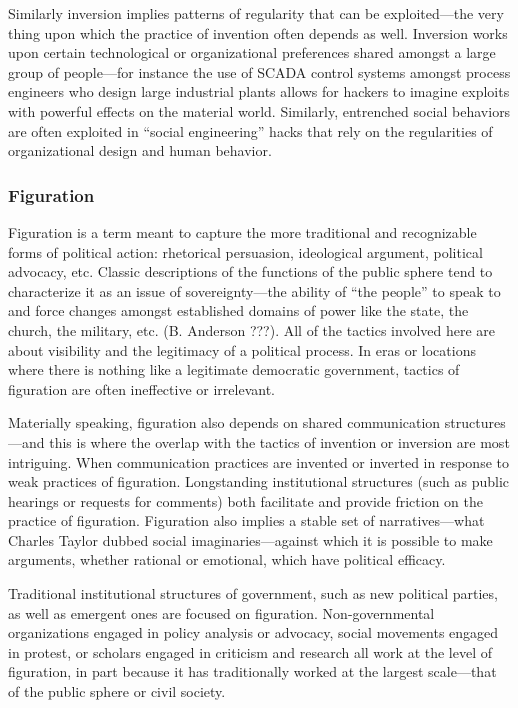 \documentclass[10pt,letter,oneside]{scrartcl}
\begin{document}
Similarly inversion implies patterns of regularity that can be exploited---the
very thing upon which the practice of invention often depends as well.
Inversion works upon certain technological or organizational preferences shared
amongst a large group of people---for instance the use of SCADA control systems
amongst process engineers who design large industrial plants allows for hackers
to imagine exploits with powerful effects on the material world.  Similarly,
entrenched social behaviors are often exploited in ``social engineering'' hacks
that rely on the regularities of organizational design and human behavior.

\subsubsection{Figuration}

Figuration is a term meant to capture the more traditional and recognizable
forms of political action: rhetorical persuasion, ideological argument,
political advocacy, etc.  Classic descriptions of the functions of the public
sphere tend to characterize it as an issue of sovereignty---the ability of
``the people'' to speak to and force changes amongst established domains of
power like the state, the church, the military, etc. (B. Anderson ???).  All of
the tactics involved here are about visibility and the legitimacy of a
political process.  In eras or locations where there is nothing like a
legitimate democratic government, tactics of figuration are often ineffective
or irrelevant.

Materially speaking, figuration also depends on shared communication
structures---and this is where the overlap with the tactics of invention or
inversion are most intriguing.  When communication practices are invented or
inverted in response to weak practices of figuration.  Longstanding
institutional structures (such as public hearings or requests for comments)
both facilitate and provide friction on the practice of figuration.  Figuration
also implies a stable set of narratives---what Charles Taylor dubbed social
imaginaries---against which it is possible to make arguments, whether rational
or emotional, which have political efficacy.

Traditional institutional structures of government, such as new political
parties, as well as emergent ones are focused on figuration. Non-governmental
organizations engaged in policy analysis or advocacy, social movements engaged
in protest, or scholars engaged in criticism and research all work at the level
of figuration, in part because it has traditionally worked at the largest
scale—that of the public sphere or civil society.
\end{document}
